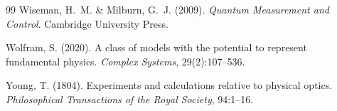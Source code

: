 \documentclass[12pt,a4paper]{article}
\theoremstyle{definition}
\theoremstyle{remark}
\begin{document}
\begin{thebibliography}{99}
Wiseman, H.~M. \& Milburn, G.~J. (2009).
\newblock \textit{Quantum Measurement and Control}.
\newblock Cambridge University Press.

Wolfram, S. (2020).
\newblock A class of models with the potential to represent fundamental physics.
\newblock \textit{Complex Systems}, 29(2):107--536.

Young, T. (1804).
\newblock Experiments and calculations relative to physical optics.
\newblock \textit{Philosophical Transactions of the Royal Society}, 94:1--16.

\end{thebibliography}
\end{document}
